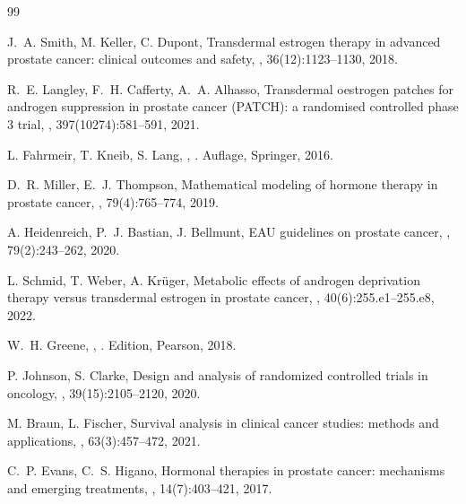 ﻿\documentclass[a4paper,12pt]{article}
\theoremstyle{definition}
\begin{document}
\begin{thebibliography}{99}

J.~A. Smith, M. Keller, C. Dupont, 
\newblock Transdermal estrogen therapy in advanced prostate cancer: clinical outcomes and safety,
, 36(12):1123--1130, 2018.

R.~E. Langley, F.~H. Cafferty, A.~A. Alhasso,
\newblock Transdermal oestrogen patches for androgen suppression in prostate cancer (PATCH): a randomised controlled phase 3 trial,
, 397(10274):581--591, 2021.

L. Fahrmeir, T. Kneib, S. Lang,
,
. Auflage, Springer, 2016.

D.~R. Miller, E.~J. Thompson,
\newblock Mathematical modeling of hormone therapy in prostate cancer,
, 79(4):765--774, 2019.

A. Heidenreich, P.~J. Bastian, J. Bellmunt,
\newblock EAU guidelines on prostate cancer,
, 79(2):243--262, 2020.

L. Schmid, T. Weber, A. Kr{\"u}ger,
\newblock Metabolic effects of androgen deprivation therapy versus transdermal estrogen in prostate cancer,
, 40(6):255.e1--255.e8, 2022.

W.~H. Greene,
,
. Edition, Pearson, 2018.

P. Johnson, S. Clarke,
\newblock Design and analysis of randomized controlled trials in oncology,
, 39(15):2105--2120, 2020.

M. Braun, L. Fischer,
\newblock Survival analysis in clinical cancer studies: methods and applications,
, 63(3):457--472, 2021.

C.~P. Evans, C.~S. Higano,
\newblock Hormonal therapies in prostate cancer: mechanisms and emerging treatments,
, 14(7):403--421, 2017.

\end{thebibliography}
\end{document}

